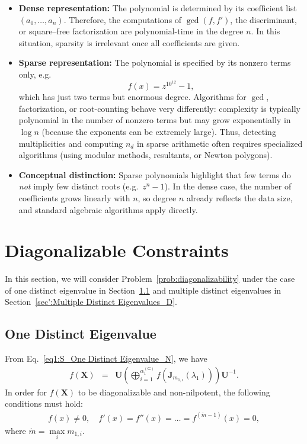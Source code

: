 \documentclass[11pt]{article}
\begin{document}
\begin{itemize}
  \item \textbf{Dense representation:}  
The polynomial is determined by its coefficient list \((a_0,\dots,a_n)\). Therefore, the computations of \(\gcd(f,f')\), the discriminant, or square--free factorization are polynomial-time in the degree \(n\). In this situation, sparsity is irrelevant once all coefficients are given.

  \item \textbf{Sparse representation:}  
  The polynomial is specified by its nonzero terms only, e.g.\ 
  \[
  f(x)=z^{10^{12}}-1,
  \]
  which has just two terms but enormous degree.  
  Algorithms for $\gcd$, factorization, or root-counting behave very differently:  
  complexity is typically polynomial in the number of nonzero terms but may grow exponentially in $\log n$ (because the exponents can be extremely large).  
  Thus, detecting multiplicities and computing $n_d$ in sparse arithmetic often requires specialized algorithms (using modular methods, resultants, or Newton polygons).

  \item \textbf{Conceptual distinction:}  
  Sparse polynomials highlight that few terms do \emph{not} imply few distinct roots (e.g.\ $z^n-1$). In the dense case, the number of coefficients grows linearly with $n$, so degree $n$ already reflects the data size, and standard algebraic algorithms apply directly.
\end{itemize}



\section{Diagonalizable Constraints}\label{sec:Diagonalizable Constraints}

In this section, we will consider Problem~\ref{prob:diagonalizability} under the case of one distinct eigenvalue in Section~\ref{sec':One Distinct Eigenvalue_D} and multiple distinct eigenvalues in Section~\ref{sec':Multiple Distinct Eigenvalues_D}.


\subsection{One Distinct Eigenvalue}\label{sec':One Distinct Eigenvalue_D}

From Eq.~\eqref{eq1:S_One Distinct Eigenvalue_N}, we have
%
\begin{eqnarray}\label{eq1:sec':One Distinct Eigenvalue_D}
f(\bm{X})&=& \bm{U}\left(\bigoplus\limits_{i=1}^{\alpha_{1}^{(\mathrm{G})}}f(\bm{J}_{m_{1,i}}(\lambda_{1}))\right)\bm{U}^{-1}.
\end{eqnarray}
%
In order for $f(\bm{X})$ to be diagonalizable and non-nilpotent, the following conditions must hold:
%
\begin{eqnarray}\label{eq2:sec':One Distinct Eigenvalue_D}
f(x)\neq 0, \quad f'(x)=f''(x)=\ldots=f^{(\acute{m}-1)}(x)=0, 
\end{eqnarray}
%
where $\acute{m} = \max\limits_{i} m_{1,i}$. 
\end{document}
